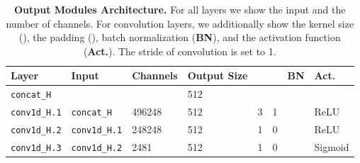 \documentclass[runningheads]{llncs}
\begin{document}
\begin{table*}[!t]
\centering
\begin{tabu} to \textwidth {X[3,c]X[5,c]X[7,c]X[3,c]X[1,c]X[1,c]X[1,c]X[2,c]}
\toprule
\textbf{Layer} & \textbf{Input}   & \textbf{Channels}      & \textbf{Output Size} & \textbf{} & \textbf{} & \textbf{BN}  & \textbf{Act.} \\ \midrule
\texttt{concat\_H}      & \fontsize{7pt}{7pt}{} &  & 512                  &                       &                       &              &               \\ \midrule
\texttt{conv1d\_H.1}    & \texttt{concat\_H}                                                                                                                               & 496248    & 512                  & 3                     & 1                     &  & ReLU          \\ \midrule
\texttt{conv1d\_H.2}    & \texttt{conv1d\_H.1}                                                                                                                             & 248248    & 512                  & 1                     & 0                     &  & ReLU          \\ \midrule
\texttt{conv1d\_H.3}    & \texttt{conv1d\_H.2}                                                                                                                             & 2481      & 512                  & 1                     & 0                     &              & Sigmoid       \\ 
\bottomrule
\end{tabu}
\caption{\textbf{Output Modules Architecture.} For all layers we show the input and the number of channels. For convolution layers, we additionally show the kernel size (), the padding (), batch normalization (\textbf{BN}), and the activation function (\textbf{Act.}). The stride of convolution is set to 1.}
\label{tab:output}
\end{table*}
\end{document}
